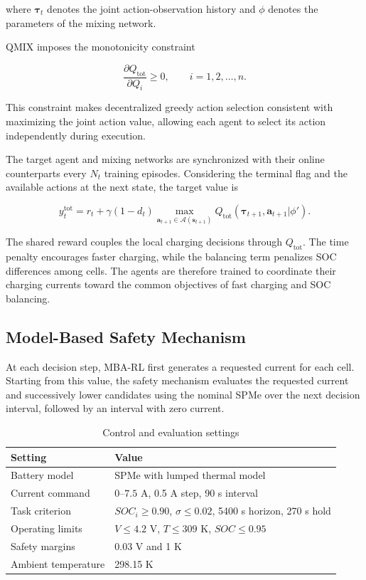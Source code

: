 \documentclass[10pt,journal,letterpaper]{IEEEtran}
\begin{document}
where $\boldsymbol{\tau}_t$ denotes the joint action-observation history and $\phi$ denotes the parameters of the mixing network.

QMIX imposes the monotonicity constraint

\begin{equation}
\label{QMIX_constraints}
\frac{\partial Q_{\mathrm{tot}}}{\partial Q_i}
\geq 0,
\qquad
i=1,2,\ldots,n.
\end{equation}

This constraint makes decentralized greedy action selection consistent with maximizing the joint action value, allowing each agent to select its action independently during execution.

The target agent and mixing networks are synchronized with their online counterparts every $N_t$ training episodes. Considering the terminal flag and the available actions at the next state, the target value is

\begin{equation}
\label{target Q}
y_t^{\mathrm{tot}}
=
r_t
+
\gamma(1-d_t)
\max_{\mathbf{a}_{t+1}\in\mathcal{A}(\mathbf{s}_{t+1})}
Q_{\mathrm{tot}}
(
\boldsymbol{\tau}_{t+1},
\mathbf{a}_{t+1}
|\phi'
).
\end{equation}

The shared reward couples the local charging decisions through $Q_{\mathrm{tot}}$. The time penalty encourages faster charging, while the balancing term penalizes SOC differences among cells. The agents are therefore trained to coordinate their charging currents toward the common objectives of fast charging and SOC balancing.

\subsection{Model-Based Safety Mechanism}

At each decision step, MBA-RL first generates a requested current for each cell. Starting from this value, the safety mechanism evaluates the requested current and successively lower candidates using the nominal SPMe over the next decision interval, followed by an interval with zero current.

\begin{table}[!t]
\centering
\caption{Control and evaluation settings}
\label{tab:experimental_settings}
\scriptsize
\setlength{\tabcolsep}{3pt}
\begin{tabular}{@{}p{}p{}@{}}
\toprule
Setting & Value \\
\midrule
Battery model & SPMe with lumped thermal model \\
Current command & $0$--$7.5$ A, 0.5 A step, 90 s interval \\
Task criterion & $SOC_i\geq0.90$, $\sigma\leq0.02$, 5400 s horizon, 270 s hold \\
Operating limits & $V\leq4.2$ V, $T\leq309$ K, $SOC\leq0.95$ \\
Safety margins & 0.03 V and 1 K \\
Ambient temperature & 298.15 K \\
\bottomrule
\end{tabular}
\end{table}
\end{document}

